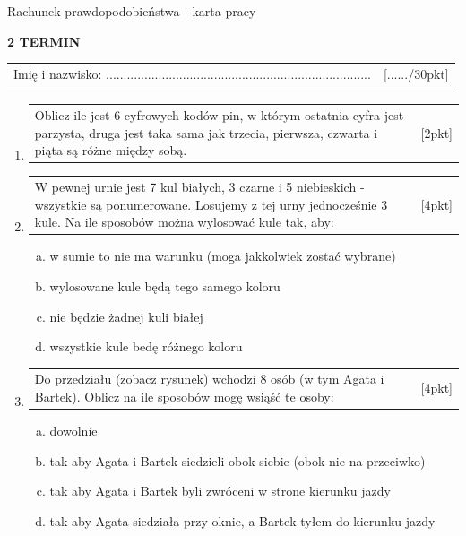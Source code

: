 \documentclass[12pt,a4paper]{article}
\begin{document}
	\begin{center}
		\LARGE Rachunek prawdopodobieństwa - karta pracy
	\end{center}
	\vspace{1.5cm}
	\begin{flushright}
		\textbf{2 TERMIN}
	\end{flushright}
	\begin{tabular}{p{13cm} r}
		Imię i nazwisko: ............................................................................
		&[....../30pkt]\\ 
		\vspace{0.5cm}
	\end{tabular}
	\begin{enumerate}[1.]
		\item  \begin{tabular}{p{13cm} r}
			Oblicz ile jest 6-cyfrowych kodów pin, w którym ostatnia cyfra jest parzysta, druga jest taka sama jak trzecia, pierwsza, czwarta i piąta są różne między sobą. &[2pkt]\\ 
		\end{tabular}
		
		\item  \begin{tabular}{p{13cm} r}
			W pewnej urnie jest 7 kul białych, 3 czarne i 5 niebieskich - wszystkie są ponumerowane. Losujemy z tej urny jednocześnie 3 kule. Na ile sposobów można wylosować kule tak, aby:  &[4pkt]\\ 
		\end{tabular}
		
		\begin{enumerate}[a)]
			\item w sumie to nie ma warunku (moga jakkolwiek zostać wybrane)
			\item wylosowane kule będą tego samego koloru
			\item nie będzie żadnej kuli białej
			\item wszystkie kule bedę różnego koloru
		\end{enumerate}
		
		\item  \begin{tabular}{p{13cm} r}
			Do przedziału (zobacz rysunek) wchodzi 8 osób (w tym Agata i Bartek). Oblicz na ile sposobów mogę wsiąść te osoby: &[4pkt]\\ 
		\end{tabular}
	
	\begin{enumerate}[a)]
		\item dowolnie
		\item tak aby Agata i Bartek siedzieli obok siebie (obok nie na przeciwko)
		\item tak aby Agata i Bartek byli zwróceni w strone kierunku jazdy
		\item tak aby Agata siedziała przy oknie, a Bartek tyłem do kierunku jazdy
	\end{enumerate}


\end{enumerate}
\end{document}
